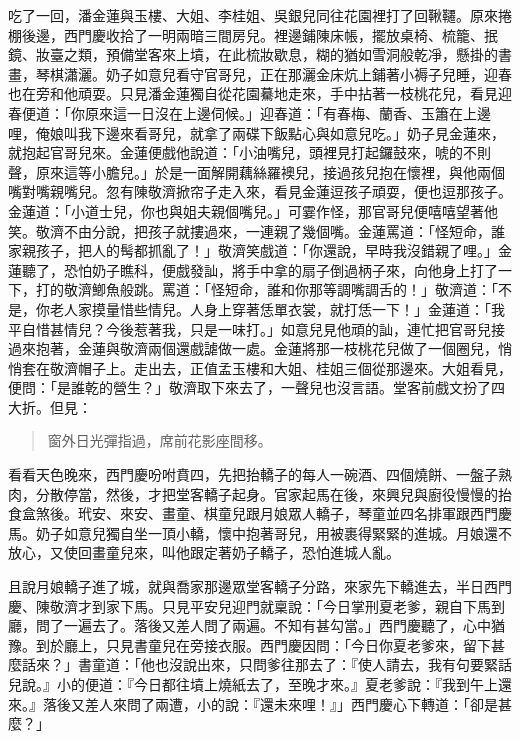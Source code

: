 吃了一回，潘金蓮與玉樓、大姐、李桂姐、吳銀兒同往花園裡打了回鞦韆。原來捲棚後邊，西門慶收拾了一明兩暗三間房兒。裡邊鋪陳床帳，擺放桌椅、梳籠、抿鏡、妝臺之類，預備堂客來上墳，在此梳妝歇息，糊的猶如雪洞般乾凈，懸掛的書畫，琴棋瀟灑。奶子如意兒看守官哥兒，正在那灑金床炕上鋪著小褥子兒睡，迎春也在旁和他頑耍。只見潘金蓮獨自從花園驀地走來，手中拈著一枝桃花兒，看見迎春便道：「你原來這一日沒在上邊伺候。」迎春道：「有春梅、蘭香、玉簫在上邊哩，俺娘叫我下邊來看哥兒，就拿了兩碟下飯點心與如意兒吃。」奶子見金蓮來，就抱起官哥兒來。金蓮便戲他說道：「小油嘴兒，頭裡見打起鑼鼓來，唬的不則聲，原來這等小膽兒。」於是一面解開藕絲羅襖兒，接過孩兒抱在懷裡，與他兩個嘴對嘴親嘴兒。忽有陳敬濟掀帘子走入來，看見金蓮逗孩子頑耍，便也逗那孩子。金蓮道：「小道士兒，你也與姐夫親個嘴兒。」可霎作怪，那官哥兒便嘻嘻望著他笑。敬濟不由分說，把孩子就摟過來，一連親了幾個嘴。金蓮罵道：「怪短命，誰家親孩子，把人的髩都抓亂了！」敬濟笑戲道：「你還說，早時我沒錯親了哩。」金蓮聽了，恐怕奶子瞧科，便戲發訕，將手中拿的扇子倒過柄子來，向他身上打了一下，打的敬濟鯽魚般跳。罵道：「怪短命，誰和你那等調嘴調舌的！」敬濟道：「不是，你老人家摸量惜些情兒。人身上穿著恁單衣裳，就打恁一下！」金蓮道：「我平自惜甚情兒？今後惹著我，只是一味打。」如意兒見他頑的訕，連忙把官哥兒接過來抱著，金蓮與敬濟兩個還戲謔做一處。金蓮將那一枝桃花兒做了一個圈兒，悄悄套在敬濟帽子上。走出去，正值孟玉樓和大姐、桂姐三個從那邊來。大姐看見，便問：「是誰乾的營生？」敬濟取下來去了，一聲兒也沒言語。堂客前戲文扮了四大折。但見：
\begin{quote}
窗外日光彈指過，席前花影座間移。
\end{quote}

看看天色晚來，西門慶吩咐賁四，先把抬轎子的每人一碗酒、四個燒餅、一盤子熟肉，分散停當，然後，才把堂客轎子起身。官家起馬在後，來興兒與廚役慢慢的抬食盒煞後。玳安、來安、畫童、棋童兒跟月娘眾人轎子，琴童並四名排軍跟西門慶馬。奶子如意兒獨自坐一頂小轎，懷中抱著哥兒，用被裹得緊緊的進城。月娘還不放心，又使回畫童兒來，叫他跟定著奶子轎子，恐怕進城人亂。

且說月娘轎子進了城，就與喬家那邊眾堂客轎子分路，來家先下轎進去，半日西門慶、陳敬濟才到家下馬。只見平安兒迎門就稟說：「今日掌刑夏老爹，親自下馬到廳，問了一遍去了。落後又差人問了兩遍。不知有甚勾當。」西門慶聽了，心中猶豫。到於廳上，只見書童兒在旁接衣服。西門慶因問：「今日你夏老爹來，留下甚麼話來？」書童道：「他也沒說出來，只問爹往那去了：『使人請去，我有句要緊話兒說。』小的便道：『今日都往墳上燒紙去了，至晚才來。』夏老爹說：『我到午上還來。』落後又差人來問了兩遭，小的說：『還未來哩！』」西門慶心下轉道：「卻是甚麼？」

